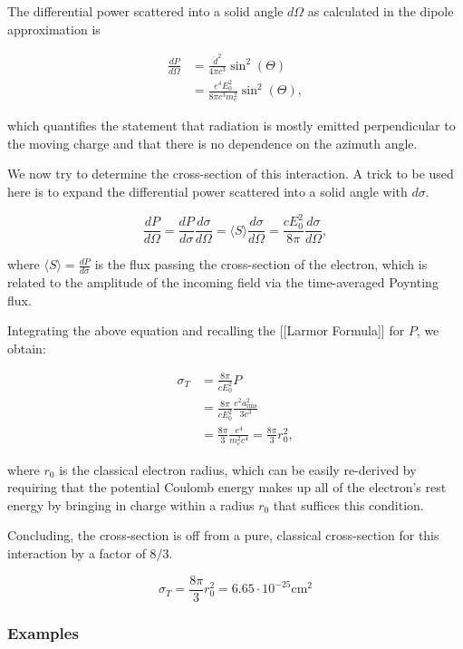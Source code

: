 \documentclass{article}
\begin{document}
The differential power scattered into a solid angle $d\Omega$ as calculated in the dipole approximation is

\begin{align}
\frac{dP}{d\Omega}&=\frac{\ddot{d}^2}{4\pi c^3} \sin^2(\Theta) \\
&=\frac{e^4E_0^2}{8\pi c^3 m_e^2} \sin^2(\Theta),
\end{align}

which quantifies the statement that radiation is mostly emitted perpendicular to the moving charge and that there is no dependence on the azimuth angle.

We now try to determine the cross-section of this interaction. A trick to be used here is to expand the differential power scattered into a solid angle with $d\sigma$.

$$\frac{dP}{d\Omega}=\frac{dP}{d\sigma}\frac{d\sigma}{d\Omega}=\langle S \rangle \frac{d\sigma}{d\Omega} = \frac{cE_0^2}{8\pi}\frac{d\sigma}{d\Omega},$$

where $\langle S\rangle=\frac{dP}{d\sigma}$ is the flux passing the cross-section of the electron, which is related to the amplitude of the incoming field via the time-averaged Poynting flux.

Integrating the above equation and recalling the [[Larmor Formula]] for $P$, we obtain:

\begin{align}
\sigma_T &= \frac{8\pi}{cE_0^2} P \\
&=\frac{8\pi}{cE_0^2}\frac{e^2 a_\text{rms}^2}{3c^3} \\
&= \frac{8\pi}{3} \frac{e^4}{m_e^2c^4}=\frac{8\pi}{3} r_0^2,
\end{align}


where $r_0$ is the classical electron radius, which can be easily re-derived by requiring that the potential Coulomb energy makes up all of the electron's rest energy by bringing in charge within a radius $r_0$ that suffices this condition.

Concluding, the cross-section is off from a pure, classical cross-section for this interaction by a factor of $8/3$.

$$\sigma_T = \frac{8\pi}{3} r_0^2 = 6.65 \cdot 10^{-25} \text{cm}^2$$

\subsubsection{Examples}
\end{document}
